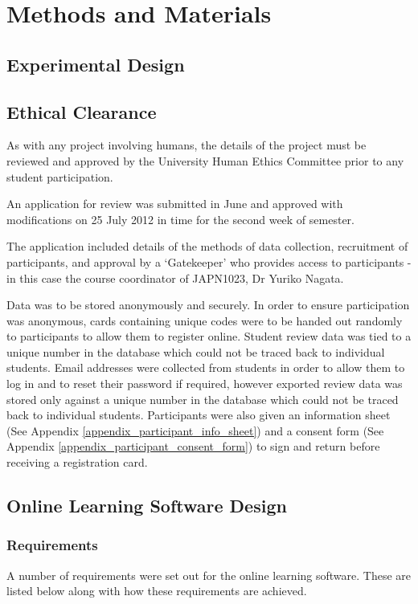 \chapter{Methods and Materials}
\label{methods}
\section{Experimental Design}
\section{Ethical Clearance}
\label{methods_ethical}
As with any project involving humans, the details of the project must be reviewed and 
approved by the University Human Ethics Committee prior to any student participation.

An application for review was submitted in June and approved with modifications
on 25 July 2012 in time for the second week of semester.

The application included details of the methods of data collection, recruitment of participants,
and approval by a `Gatekeeper' who provides access to participants - in this case the course coordinator of JAPN1023, Dr Yuriko Nagata.

Data was to be stored anonymously and securely. In order to ensure participation was anonymous,
cards containing unique codes were to be handed out randomly to participants to allow them to
register online. Student review data was tied to a unique number in the database which could
not be traced back to individual students. Email addresses were collected from students in order
to allow them to log in and to reset their password if required, however exported review data was
stored only against a unique number in the database which could not be traced back to individual
students. Participants were also given an information sheet (See Appendix
\ref{appendix_participant_info_sheet}) and a consent form (See Appendix
\ref{appendix_participant_consent_form}) to sign and return before receiving a registration card.

\section{Online Learning Software Design}
\label{methods_softwaredesign}
\subsection{Requirements}

A number of requirements were set out for the online learning software. These are listed below along
with how these requirements are achieved.

